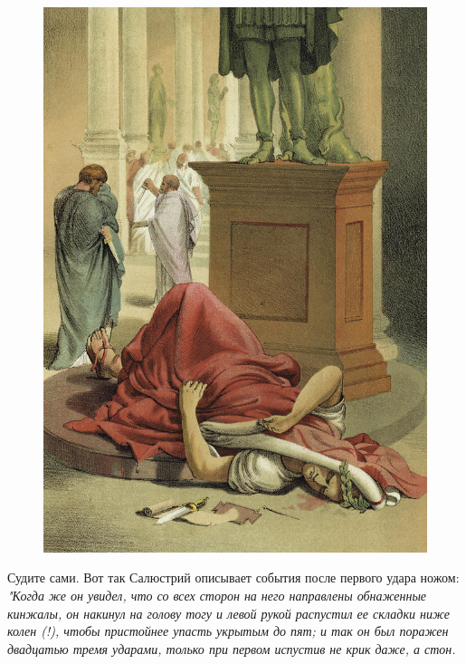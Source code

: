 \begin{figure}[h!tb] 
	\centering\includegraphics[scale=0.4]{ReligionRomeCaesar/1595745697116880936.jpg}
\end{figure}

Судите сами.
Вот так Салюстрий описывает события после первого удара ножом:
\textit{"Когда же он увидел, что со всех сторон на него направлены обнаженные кинжалы, он накинул на голову тогу и левой рукой распустил ее складки ниже колен (!), чтобы пристойнее упасть укрытым до пят; и так он был поражен двадцатью тремя ударами, только при первом испустив не крик даже, а стон. }


